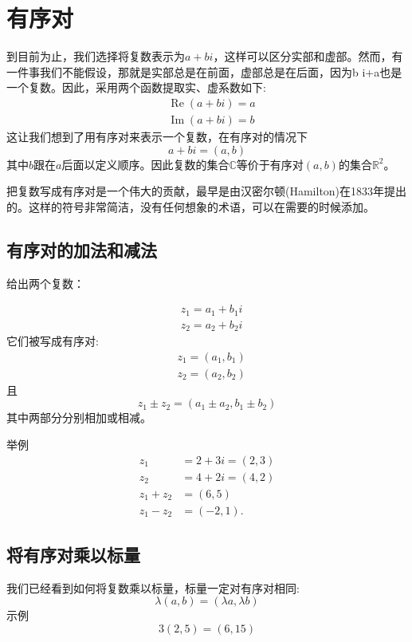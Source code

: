 \section{有序对}
到目前为止，我们选择将复数表示为$a+b i$，这样可以区分实部和虚部。然而，有一件事我们不能假设，那就是实部总是在前面，虚部总是在后面，因为b i+a也是一个复数。因此，采用两个函数提取实、虚系数如下:
$$
  \begin{aligned}
     & \operatorname{Re}(a+b i)=a \\
     & \operatorname{Im}(a+b i)=b
  \end{aligned}
$$
这让我们想到了用有序对来表示一个复数，在有序对的情况下
$$
  a+b i=(a, b)
$$
其中$b$跟在$a$后面以定义顺序。因此复数的集合$\mathbb{C}$等价于有序对$(a, b)$的集合$\mathbb{R}^{2}$。

把复数写成有序对是一个伟大的贡献，最早是由汉密尔顿(Hamilton)在1833年提出的。这样的符号非常简洁，没有任何想象的术语，可以在需要的时候添加。

\subsection{有序对的加法和减法}
给出两个复数：

$$
  \begin{aligned}
     & z_{1}=a_{1}+b_{1} i \\
     & z_{2}=a_{2}+b_{2} i
  \end{aligned}
$$
它们被写成有序对:
$$
  \begin{aligned}
     & z_{1}=\left(a_{1}, b_{1}\right) \\
     & z_{2}=\left(a_{2}, b_{2}\right)
  \end{aligned}
$$
且
$$
  z_{1} \pm z_{2}=\left(a_{1} \pm a_{2}, b_{1} \pm b_{2}\right)
$$
其中两部分分别相加或相减。

举例
$$
  \begin{aligned}
    z_{1}       & =2+3 i=(2,3) \\
    z_{2}       & =4+2 i=(4,2) \\
    z_{1}+z_{2} & =(6,5)       \\
    z_{1}-z_{2} & =(-2,1) .
  \end{aligned}
$$

\subsection{将有序对乘以标量}
我们已经看到如何将复数乘以标量，标量一定对有序对相同:
$$
  \lambda(a, b)=(\lambda a, \lambda b)
$$
示例
$$
  3(2,5)=(6,15)
$$

